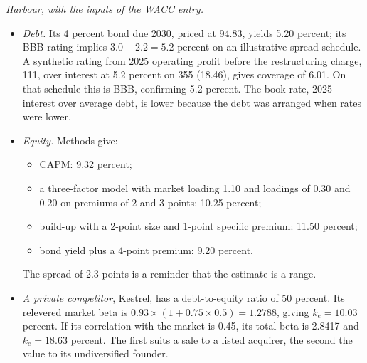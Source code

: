 \begin{qfmethod}
 \emph{Harbour, with the inputs of the \hyperref[meth:wacc-calculation]{WACC} entry.}
\begin{itemize}
\item \emph{Debt.} Its 4 percent bond due 2030, priced at 94.83, yields 5.20 percent; its BBB rating implies $3.0+2.2=5.2$ percent on an illustrative spread schedule. A synthetic rating from 2025 operating profit before the restructuring charge, 111, over interest at 5.2 percent on 355 (18.46), gives coverage of 6.01. On that schedule this is BBB, confirming 5.2 percent. The book rate, 2025 interest over average debt, is lower because the debt was arranged when rates were lower.
\item \emph{Equity.} Methods give:
\begin{itemize}
\item CAPM: 9.32 percent;
\item a three-factor model with market loading 1.10 and loadings of 0.30 and 0.20 on premiums of 2 and 3 points: 10.25 percent;
\item build-up with a 2-point size and 1-point specific premium: 11.50 percent;
\item bond yield plus a 4-point premium: 9.20 percent.
\end{itemize}
The spread of 2.3 points is a reminder that the estimate is a range.
\item \emph{A private competitor}, Kestrel, has a debt-to-equity ratio of 50 percent. Its relevered market beta is $0.93\times(1+0.75\times0.5)=1.2788$, giving $k_e=10.03$ percent. If its correlation with the market is 0.45, its total beta is 2.8417 and $k_e=18.63$ percent. The first suits a sale to a listed acquirer, the second the value to its undiversified founder.
\end{itemize}


\end{qfmethod}

